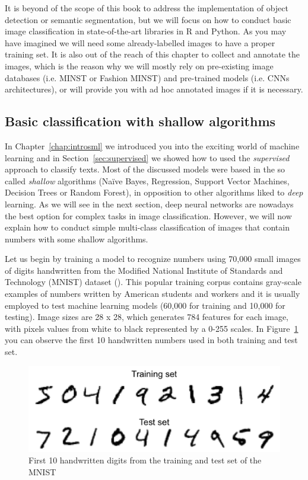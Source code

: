 It is beyond of the scope of this book to address the implementation of object detection or semantic segmentation, but we will focus on how to conduct basic image classification in state-of-the-art libraries in R and Python. As you may have imagined we will need some already-labelled images to have a proper training set. It is also out of the reach of this chapter to collect and annotate the images, which is the reason why we will mostly rely on pre-existing image databases (i.e. MINST or Fashion MINST) and pre-trained models (i.e. CNNs architectures), or will provide you with ad hoc annotated images if it is necessary. 

\subsection{Basic classification with shallow algorithms}
\label{subsec:shallow}

In Chapter~\ref{chap:introsml} we introduced you into the exciting world of machine learning and in Section~\ref{sec:supervised} we showed how to used the \textit{supervised} approach to classify texts. Most of the discussed models were based in the so called \textit{shallow} algorithms (Naïve Bayes, Regression, Support Vector Machines, Decision Trees or Random Forest), in opposition to other algorithms liked to \textit{deep} learning. As we will see in the next section, deep neural networks are nowadays the best option for complex tasks in image classification. However, we will now explain how to conduct simple multi-class classification of images that contain numbers with some shallow algorithms.

Let us begin by training a model to recognize numbers using 70,000 small images of digits handwritten from the Modified National Institute of Standards and Technology (MNIST) dataset  (\cite{lecun1998gradient}). This popular training corpus contains gray-scale examples of numbers written by American students and workers and it is usually employed to test machine learning models (60,000 for training and 10,000 for testing). Image sizes are 28 x 28, which generates 784 features for each image, with pixels values from white to black represented by a 0-255 scales. In Figure~\ref{fig:numbers} you can observe the first 10 handwritten numbers used in both training and test set.

\begin{figure}
\centering
\includegraphics[width=0.9\linewidth]{figures/ch15_numbers.png}
\caption{First 10 handwritten digits from the training and test set of the MNIST}
\label{fig:numbers}
\end{figure}

